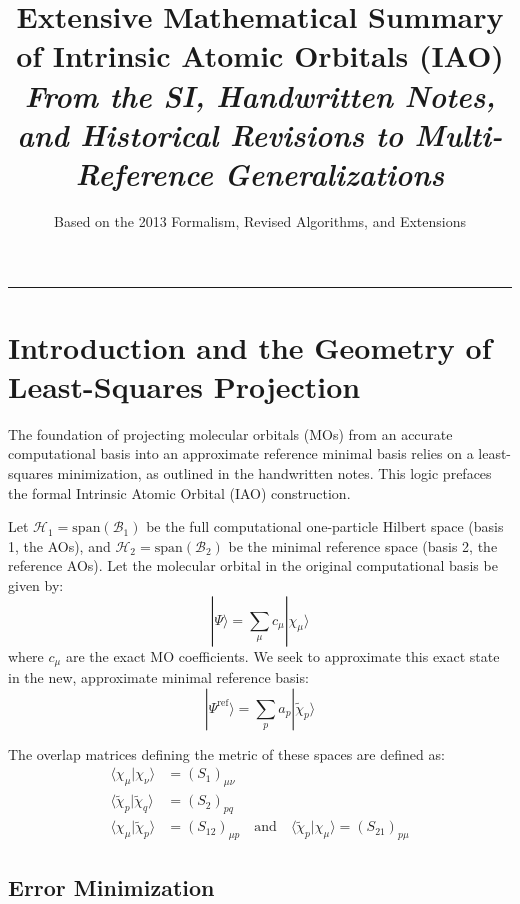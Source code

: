 \documentclass[11pt]{article}
\title{\LARGE \textbf{Extensive Mathematical Summary of Intrinsic Atomic Orbitals (IAO)} \\ \vspace{0.5em} \large \textit{From the SI, Handwritten Notes, and Historical Revisions to Multi-Reference Generalizations}}
\author{Based on the 2013 Formalism, Revised Algorithms, and Extensions}
\date{}
\begin{document}
\maketitle

\tableofcontents
\vspace{1cm}
\hrule
\vspace{1cm}

\section{Introduction and the Geometry of Least-Squares Projection}

The foundation of projecting molecular orbitals (MOs) from an accurate computational basis into an approximate reference minimal basis relies on a least-squares minimization, as outlined in the handwritten notes. This logic prefaces the formal Intrinsic Atomic Orbital (IAO) construction.

Let $\mathcal{H}_1 = \text{span}(\mathcal{B}_1)$ be the full computational one-particle Hilbert space (basis 1, the AOs), and $\mathcal{H}_2 = \text{span}(\mathcal{B}_2)$ be the minimal reference space (basis 2, the reference AOs). Let the molecular orbital in the original computational basis be given by:
\begin{equation}
    |\Psi\rangle = \sum_{\mu} c_{\mu} |\chi_{\mu}\rangle
\end{equation}
where $c_{\mu}$ are the exact MO coefficients. We seek to approximate this exact state in the new, approximate minimal reference basis:
\begin{equation}
    |\Psi^{\text{ref}}\rangle = \sum_{p} a_{p} |\tilde{\chi}_{p}\rangle
\end{equation}

The overlap matrices defining the metric of these spaces are defined as:
\begin{align}
    \langle \chi_{\mu} | \chi_{\nu} \rangle &= (S_1)_{\mu\nu} \\
    \langle \tilde{\chi}_{p} | \tilde{\chi}_{q} \rangle &= (S_2)_{pq} \\
    \langle \chi_{\mu} | \tilde{\chi}_{p} \rangle &= (S_{12})_{\mu p} \quad \text{and} \quad \langle \tilde{\chi}_{p} | \chi_{\mu} \rangle = (S_{21})_{p \mu}
\end{align}

\subsection{Error Minimization}
\end{document}
